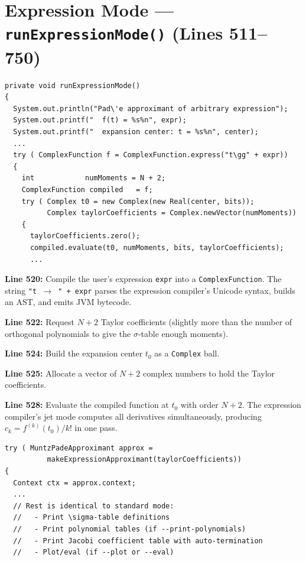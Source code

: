 \documentclass[a4paper,11pt]{article}
\begin{document}
\section{Expression Mode --- \texttt{runExpressionMode()} (Lines 511--750)}

\begin{lstlisting}[firstnumber=511]
private void runExpressionMode()
{
  System.out.println("Pad\'e approximant of arbitrary expression");
  System.out.printf("  f(t) = %s%n", expr);
  System.out.printf("  expansion center: t = %s%n", center);
  ...
  try ( ComplexFunction f = ComplexFunction.express("t\gg" + expr))
  {
    int            numMoments = N + 2;
    ComplexFunction compiled   = f;
    try ( Complex t0 = new Complex(new Real(center, bits));
          Complex taylorCoefficients = Complex.newVector(numMoments))
    {
      taylorCoefficients.zero();
      compiled.evaluate(t0, numMoments, bits, taylorCoefficients);
      ...
\end{lstlisting}

\textbf{Line 520:} Compile the user's expression \texttt{expr} into a
\texttt{ComplexFunction}. The string \texttt{"t $\rightarrow$ " + expr} parses
the expression compiler's Unicode syntax, builds an AST, and emits JVM bytecode.

\textbf{Line 522:} Request $N+2$ Taylor coefficients (slightly more than the
number of orthogonal polynomials to give the $\sigma$-table enough moments).

\textbf{Line 524:} Build the expansion center $t_0$ as a \texttt{Complex} ball.

\textbf{Line 525:} Allocate a vector of $N+2$ complex numbers to hold the
Taylor coefficients.

\textbf{Line 528:} Evaluate the compiled function at $t_0$ with order $N+2$.
The expression compiler's jet mode computes all derivatives simultaneously,
producing $c_k = f^{(k)}(t_0)/k!$ in one pass.

\newpage

\begin{lstlisting}[firstnumber=546]
try ( MuntzPadeApproximant approx =
          makeExpressionApproximant(taylorCoefficients))
{
  Context ctx = approx.context;
  ...
  // Rest is identical to standard mode:
  //   - Print \sigma-table definitions
  //   - Print polynomial tables (if --print-polynomials)
  //   - Print Jacobi coefficient table with auto-termination
  //   - Plot/eval (if --plot or --eval)
\end{lstlisting}
\end{document}
